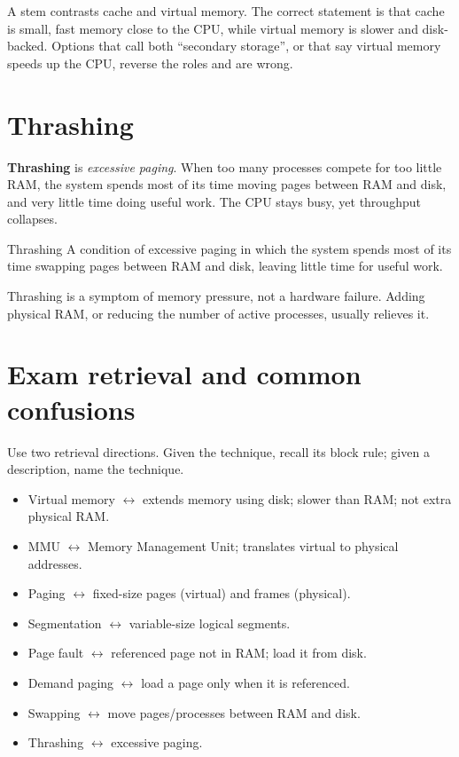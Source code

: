 \begin{example}
A stem contrasts cache and virtual memory. The correct statement is that cache
is small, fast memory close to the CPU, while virtual memory is slower and
disk-backed. Options that call both ``secondary storage'', or that say virtual
memory speeds up the CPU, reverse the roles and are wrong.
\end{example}

\section{Thrashing}
\textbf{Thrashing} is \emph{excessive paging}. When too many processes compete
for too little RAM, the system spends most of its time moving pages between RAM
and disk, and very little time doing useful work. The CPU stays busy, yet
throughput collapses.

\begin{definitionbox}{Thrashing}
A condition of excessive paging in which the system spends most of its time
swapping pages between RAM and disk, leaving little time for useful work.
\end{definitionbox}

Thrashing is a symptom of memory pressure, not a hardware failure. Adding
physical RAM, or reducing the number of active processes, usually relieves it.

\section{Exam retrieval and common confusions}
Use two retrieval directions. Given the technique, recall its block rule; given
a description, name the technique.
\begin{itemize}
  \item Virtual memory $\leftrightarrow$ extends memory using disk; slower than
    RAM; not extra physical RAM.
  \item MMU $\leftrightarrow$ Memory Management Unit; translates virtual to
    physical addresses.
  \item Paging $\leftrightarrow$ fixed-size pages (virtual) and frames
    (physical).
  \item Segmentation $\leftrightarrow$ variable-size logical segments.
  \item Page fault $\leftrightarrow$ referenced page not in RAM; load it from
    disk.
  \item Demand paging $\leftrightarrow$ load a page only when it is referenced.
  \item Swapping $\leftrightarrow$ move pages/processes between RAM and disk.
  \item Thrashing $\leftrightarrow$ excessive paging.
\end{itemize}

